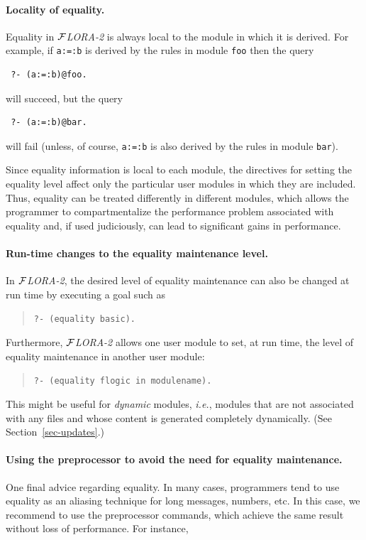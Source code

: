 \documentclass[11pt]{article}
\newcommand{\FLORA}{{\mbox{${\cal F}${\small\it LORA}\rm\emph{-2}}}\xspace}
\begin{document}
\paragraph{Locality of equality.}
Equality in \FLORA is always local to the module in which it is derived.
For example, if {\tt a:=:b} is derived by the rules in module {\tt foo}
then the query
\begin{verbatim}
 ?- (a:=:b)@foo.  
\end{verbatim}
will succeed, but the query
\begin{verbatim}
 ?- (a:=:b)@bar.  
\end{verbatim}
will fail (unless, of course, {\tt a:=:b} is also derived by the rules in
module {\tt bar}).

Since equality information is local to each module, the directives for
setting the equality level affect only the particular user modules in which
they are included.  Thus, equality can be treated differently in different
modules, which allows the programmer to compartmentalize the performance
problem associated with equality and, if used judiciously, can lead to
significant gains in performance.

\paragraph{Run-time changes to the equality maintenance level.}
In \FLORA, the desired level of equality maintenance can also be changed at
run time by executing a goal such as
\begin{quote}
 {\tt ?- (equality basic).}
\end{quote}
Furthermore, \FLORA allows one user module to set, at run time, the level
of equality maintenance in another user module:
\begin{quote}
\verb!?- (equality flogic in modulename).!
\end{quote}
This might be useful for \emph{dynamic} modules, {\it i.e.}, modules that
are not associated with any files and whose content is generated completely
dynamically. (See Section~\ref{sec-updates}.)

\paragraph{Using the preprocessor to avoid the need for equality maintenance.}
One final advice regarding equality. In many cases, programmers tend to use
equality as an aliasing technique for long messages, numbers, etc. In this
case, we recommend to use the preprocessor commands, which achieve the same
result without loss of performance. For instance,
\end{document}
